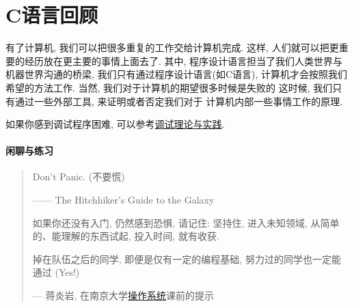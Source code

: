 
\part{C语言回顾}

有了计算机, 我们可以把很多重复的工作交给计算机完成.
这样, 人们就可以把更重要的经历放在更主要的事情上面去了. 
其中, 程序设计语言担当了我们人类世界与机器世界沟通的桥梁, 
我们只有通过程序设计语言(如C语言), 计算机才会按照我们
希望的方法工作. 当然, 我们对于计算机的期望很多时候是失败的
这时候, 我们只有通过一些外部工具, 来证明或者否定我们对于
计算机内部一些事情工作的原理. 

如果你感到调试程序困难, 可以参考\href{https://www.bilibili.com/video/BV1f54y1K7rQ}{调试理论与实践}.



\subsection*{闲聊与练习}

\begin{quote}

      Don't Panic. (不要慌) 
    
    \hfill—— The Hitchhiker's Guide to the Galaxy

    如果你还没有入门, 仍然感到恐惧, 请记住: 坚持住, 进入未知领域, 从简单的、能理解的东西试起, 
    投入时间, 就有收获. 
    
    掉在队伍之后的同学, 即便是仅有一定的编程基础, 努力过的同学也一定能通过 (Yes!)

    \hfill --- 蒋炎岩, 在南京大学\href{http://jyywiki.cn/OS/OS_Guide}{操作系统}课前的提示
\end{quote}